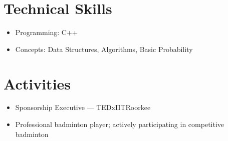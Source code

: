\documentclass[letterpaper,11pt]{article}
\begin{document}

\section{Technical Skills}

\begin{itemize}[leftmargin=*]
\item Programming: C++
\item Concepts: Data Structures, Algorithms, Basic Probability
\end{itemize}


\section{Activities}

\begin{itemize}[leftmargin=*]
\item Sponsorship Executive — TEDxIITRoorkee
\item Professional badminton player; actively participating in competitive badminton
\end{itemize}
\end{document}
